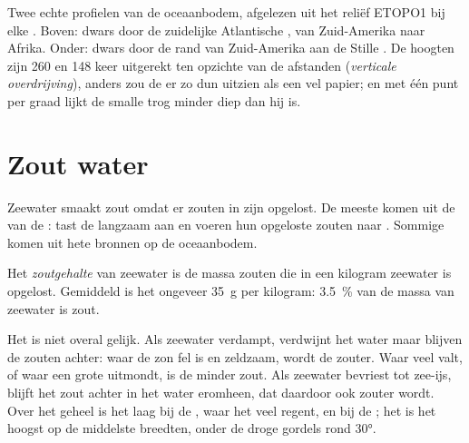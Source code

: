 \begin{omfigure}
{\small Twee echte profielen van de oceaanbodem, afgelezen uit het reliëf
ETOPO1 bij elke . Boven: dwars door de zuidelijke Atlantische
, van Zuid-Amerika naar Afrika. Onder: dwars door de rand van
Zuid-Amerika aan de Stille . De hoogten zijn 260 en 148 keer
uitgerekt ten opzichte van de afstanden (\emph{verticale overdrijving}),
anders zou de  er zo dun uitzien als een vel papier; en met één punt
per graad lijkt de smalle trog minder diep dan hij is.}
\label{fig:g8:the-oceans:profiles}
\end{omfigure}


\section{Zout water}

Zeewater smaakt zout omdat er zouten in zijn opgelost. De meeste komen uit
de  van de :  tast de  langzaam aan en
 voeren hun opgeloste zouten naar . Sommige komen uit hete
bronnen op de oceaanbodem.

\begin{definition}[Zoutgehalte]\label{def:g8:the-oceans:salinity}
Het \emph{zoutgehalte} van zeewater is de massa zouten
die in een kilogram zeewater is opgelost. Gemiddeld is het ongeveer
\qty{35}{g} per kilogram: \qty{3.5}{\%} van de massa van zeewater is
zout.
\end{definition}

Het  is niet overal gelijk. Als zeewater verdampt, verdwijnt
het water maar blijven de zouten achter: waar de zon fel is en 
zeldzaam, wordt de  zouter. Waar veel  valt, of waar een grote
 uitmondt, is de  minder zout. Als zeewater bevriest tot zee-ijs,
blijft het zout achter in het water eromheen, dat daardoor ook zouter
wordt. Over het geheel is het  laag bij de , waar het
veel regent, en bij de ; het is het hoogst op de middelste
breedten, onder de droge gordels rond \ang{30}.

